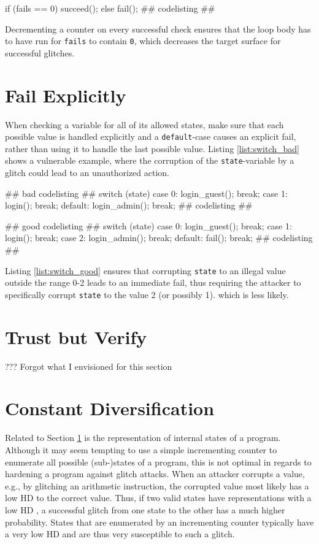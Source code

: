 if (fails == 0)
	succeed();
else
	fail();
\label{list:check_good}
## codelisting ##


Decrementing a counter on every successful check ensures that the loop body has to have run for \texttt{fails} to contain \texttt{0}, which decreases the target surface for successful glitches.

\section{Fail Explicitly}
\label{sec:fail_explicit}

When checking a variable for all of its allowed states, make sure that each possible value is handled explicitly and a \texttt{default}-case causes an explicit fail, rather than using it to handle the last possible value. Listing \ref{list:switch_bad} shows a vulnerable example, where the corruption of the \texttt{state}-variable by a glitch could lead to an unauthorized action.

## bad codelisting ##
switch (state) {
	case 0: login_guest(); break;
	case 1: login(); break;
	default: login_admin(); break;
}
\label{list:switch_bad}
## codelisting ##

## good codelisting ##
switch (state) {
	case 0: login_guest(); break;
	case 1: login(); break;
	case 2: login_admin(); break;
	default: fail(); break;
}
\label{list:switch_good}
## codelisting ##

Listing \ref{list:switch_good} ensures that corrupting \texttt{state} to an illegal value outside the range 0-2 leads to an immediate fail, thus requiring the attacker to specifically corrupt \texttt{state} to the value 2 (or possibly 1). which is less likely.\,\cite{witteman2008secure}


\section{Trust but Verify}
??? Forgot what I envisioned for this section
\section{Constant Diversification}
\label{sec:manual_diverse}
Related to Section \ref{sec:fail_explicit} is the representation of internal states of a program. Although it may seem tempting to use a simple incrementing counter to enumerate all possible (sub-)states of a program, this is not optimal in regards to hardening a program against glitch attacks. When an attacker corrupts a value, e.g., by glitching an arithmetic instruction, the corrupted value most likely has a low HD  to the correct value. Thus, if two valid states have representations with a low HD , a successful glitch from one state to the other has a much higher probability. States that are enumerated by an incrementing counter typically have a very low HD  and are thus very susceptible to such a glitch.\,\cite{witteman2008secure}

